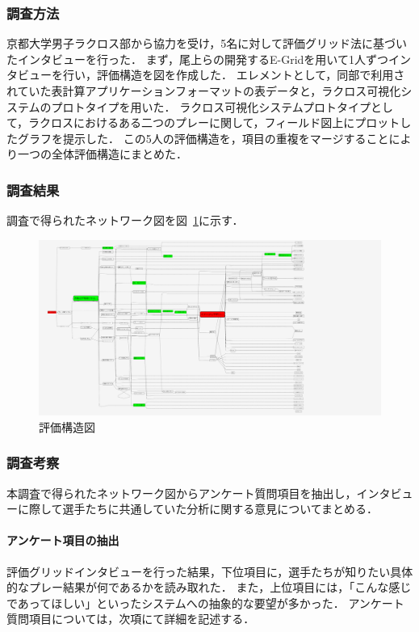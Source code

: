 \documentclass[sotsuron]{kuee}
\begin{document}
			\subsubsection{調査方法}
				京都大学男子ラクロス部から協力を受け，5名に対して評価グリッド法に基づいたインタビューを行った．
				まず，尾上らの開発するE-Gridを用いて1人ずつインタビューを行い，評価構造を図を作成した．
				エレメントとして，同部で利用されていた表計算アプリケーションフォーマットの表データと，ラクロス可視化システムのプロトタイプを用いた．
				ラクロス可視化システムプロトタイプとして，ラクロスにおけるある二つのプレーに関して，フィールド図上にプロットしたグラフを提示した．
				この5人の評価構造を，項目の重複をマージすることにより一つの全体評価構造にまとめた．
			\subsubsection{調査結果}	
				調査で得られたネットワーク図を図~\ref{fig:egrid}に示す．
					\begin{figure}
						\begin{center}
							\includegraphics[width=\linewidth,angle=90]{./png/egrid.png}
						\end{center}
						\caption{評価構造図}
				  		\label{fig:egrid}
					\end{figure}
			\subsubsection{調査考察}
				本調査で得られたネットワーク図からアンケート質問項目を抽出し，インタビューに際して選手たちに共通していた分析に関する意見についてまとめる．
				\paragraph{アンケート項目の抽出}
					評価グリッドインタビューを行った結果，下位項目に，選手たちが知りたい具体的なプレー結果が何であるかを読み取れた．
					また，上位項目には，「こんな感じであってほしい」といったシステムへの抽象的な要望が多かった．
					アンケート質問項目については，次項にて詳細を記述する．
\end{document}
